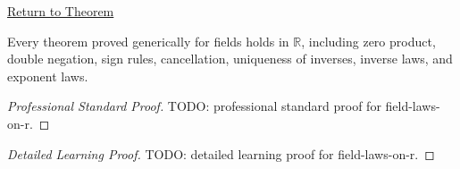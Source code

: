 \newpage
{}
\label{prf:field-laws-on-r}

\begin{remark*}[Return]
\hyperref[cor:field-laws-on-r]{Return to Theorem}
\end{remark*}

\begin{corollary*}
Every theorem proved generically for fields holds in $\mathbb{R}$, including
zero product, double negation, sign rules, cancellation, uniqueness of
inverses, inverse laws, and exponent laws.
\end{corollary*}

\begin{proof}[Professional Standard Proof]
\LRAProofBodyStart
TODO: professional standard proof for field-laws-on-r.
\end{proof}

\begin{proof}[Detailed Learning Proof]
\LRAProofBodyStart
TODO: detailed learning proof for field-laws-on-r.
\end{proof}

\begin{remark*}
\end{remark*}

\NoLocalDependencies

\clearpage
